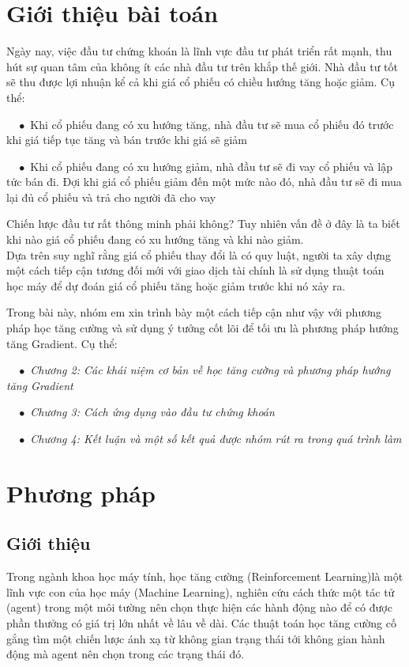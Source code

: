 \documentclass[14pt]{extreport}
\begin{document}
\tableofcontents
\newpage


\newpage
\chapter{Giới thiệu bài toán}

Ngày nay, việc đầu tư chứng khoán là lĩnh vực đầu tư phát triển rất mạnh, thu hút sự quan tâm của không ít các nhà đầu tư trên khắp thế giới. Nhà đầu tư tốt sẽ thu được lợi nhuận kể cả khi giá cổ phiếu có chiều hướng tăng hoặc giảm. Cụ thể:

$\quad \bullet$ Khi cổ phiếu đang có xu hướng tăng, nhà đầu tư sẽ mua cổ phiếu đó trước khi giá tiếp tục tăng và bán trước khi giá sẽ giảm

$\quad \bullet$ Khi cổ phiếu đang có xu hướng giảm, nhà đầu tư sẽ đi vay cổ phiếu và lập tức bán đi. Đợi khi giá cổ phiếu giảm đến một mức nào đó, nhà đầu tư sẽ đi mua lại đủ cổ phiếu và trả cho người đã cho vay

Chiến lược đầu tư rất thông minh phải không? Tuy nhiên vấn đề ở đây là ta biết khi nào giá cổ phiếu đang có xu hướng tăng và khi nào giảm.
\\ 

Dựa trên suy nghĩ rằng giá cổ phiếu thay đổi là có quy luật, người ta xây dựng một cách tiếp cận tương đối mới với giao dịch tài chính là sử dụng thuật toán học máy để dự đoán giá cổ phiếu tăng hoặc giảm trước khi nó xảy ra.

Trong bài này, nhóm em xin trình bày một cách tiếp cận như vậy với phương pháp học tăng cường và sử dụng ý tưởng cốt lõi để tối ưu là phương pháp hướng tăng Gradient. Cụ thể:

$\quad \bullet$ \textit{Chương 2: Các khái niệm cơ bản về học tăng cường và phương pháp hướng tăng Gradient}

$\quad \bullet$ \textit{Chương 3: Cách ứng dụng vào đầu tư chứng khoán}

$\quad \bullet$ \textit{Chương 4: Kết luận và một số kết quả được nhóm rút ra trong quá trình làm}

\chapter{Phương pháp}
\section{Giới thiệu}

 Trong ngành khoa học máy tính, học tăng cường (Reinforcement Learning)là một lĩnh vực con của học máy (Machine Learning), nghiên cứu cách thức một tác tử (agent) trong một môi tường nên chọn thực hiện các hành động nào để có được phần thưởng có giá trị lớn nhất về lâu về dài. Các thuật toán học tăng cường cố gắng tìm một chiến lược ánh xạ từ không gian trạng thái tới không gian hành động mà agent nên chọn trong các trạng thái đó.
 
\end{document}
